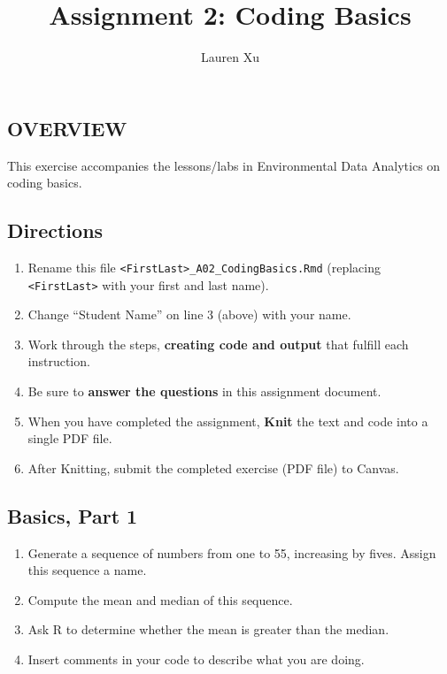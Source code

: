 \documentclass[
]{article}
\title{Assignment 2: Coding Basics}
\author{Lauren Xu}
\date{}
\providecommand{\tightlist}{%
  \setlength{\itemsep}{0pt}\setlength{\parskip}{0pt}}
\begin{document}
\maketitle

\subsection{OVERVIEW}\label{overview}

This exercise accompanies the lessons/labs in Environmental Data
Analytics on coding basics.

\subsection{Directions}\label{directions}

\begin{enumerate}
\def\labelenumi{\arabic{enumi}.}
\tightlist
\item
  Rename this file
  \texttt{\textless{}FirstLast\textgreater{}\_A02\_CodingBasics.Rmd}
  (replacing \texttt{\textless{}FirstLast\textgreater{}} with your first
  and last name).
\item
  Change ``Student Name'' on line 3 (above) with your name.
\item
  Work through the steps, \textbf{creating code and output} that fulfill
  each instruction.
\item
  Be sure to \textbf{answer the questions} in this assignment document.
\item
  When you have completed the assignment, \textbf{Knit} the text and
  code into a single PDF file.
\item
  After Knitting, submit the completed exercise (PDF file) to Canvas.
\end{enumerate}

\subsection{Basics, Part 1}\label{basics-part-1}

\begin{enumerate}
\def\labelenumi{\arabic{enumi}.}
\item
  Generate a sequence of numbers from one to 55, increasing by fives.
  Assign this sequence a name.
\item
  Compute the mean and median of this sequence.
\item
  Ask R to determine whether the mean is greater than the median.
\item
  Insert comments in your code to describe what you are doing.
\end{enumerate}
\end{document}
